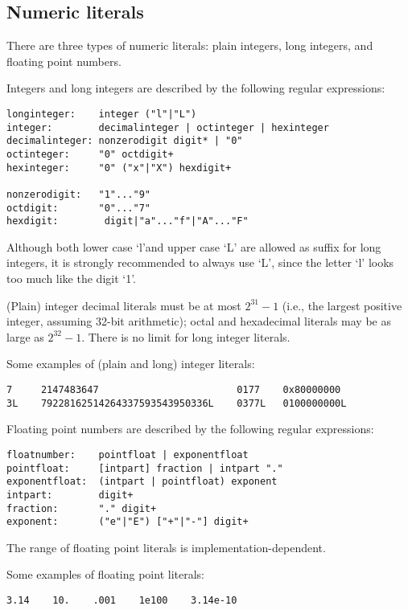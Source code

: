 \subsection{Numeric literals}

There are three types of numeric literals: plain integers, long
integers, and floating point numbers.

Integers and long integers are described by the following regular expressions:

\begin{verbatim}
longinteger:    integer ("l"|"L")
integer:        decimalinteger | octinteger | hexinteger
decimalinteger: nonzerodigit digit* | "0"
octinteger:     "0" octdigit+
hexinteger:     "0" ("x"|"X") hexdigit+

nonzerodigit:   "1"..."9"
octdigit:       "0"..."7"
hexdigit:        digit|"a"..."f"|"A"..."F"
\end{verbatim}

Although both lower case `l'and upper case `L' are allowed as suffix
for long integers, it is strongly recommended to always use `L', since
the letter `l' looks too much like the digit `1'.

(Plain) integer decimal literals must be at most $2^{31} - 1$ (i.e., the
largest positive integer, assuming 32-bit arithmetic); octal and
hexadecimal literals may be as large as $2^{32} - 1$.  There is no limit
for long integer literals.

Some examples of (plain and long) integer literals:

\begin{verbatim}
7     2147483647                        0177    0x80000000
3L    79228162514264337593543950336L    0377L   0100000000L
\end{verbatim}

Floating point numbers are described by the following regular expressions:

\begin{verbatim}
floatnumber:    pointfloat | exponentfloat
pointfloat:     [intpart] fraction | intpart "."
exponentfloat:  (intpart | pointfloat) exponent
intpart:        digit+
fraction:       "." digit+
exponent:       ("e"|"E") ["+"|"-"] digit+
\end{verbatim}

The range of floating point literals is implementation-dependent.

Some examples of floating point literals:

\begin{verbatim}
3.14    10.    .001    1e100    3.14e-10
\end{verbatim}

